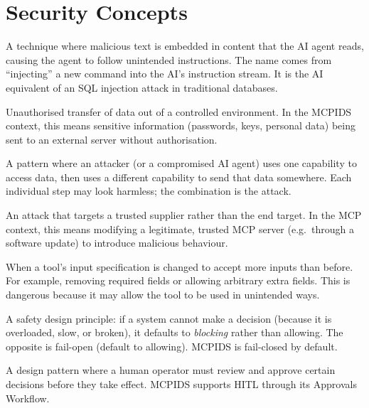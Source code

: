 \documentclass[12pt,a4paper]{report}
\begin{document}
\section{Security Concepts}

\begin{description}[leftmargin=0pt]

  \item[\textbf{Prompt Injection.}] A technique where malicious text is
    embedded in content that the AI agent reads, causing the agent to follow
    unintended instructions. The name comes from ``injecting'' a new command
    into the AI's instruction stream. It is the AI equivalent of an SQL
    injection attack in traditional databases.

  \item[\textbf{Exfiltration.}] Unauthorised transfer of data out of a
    controlled environment. In the MCPIDS context, this means sensitive
    information (passwords, keys, personal data) being sent to an external
    server without authorisation.

  \item[\textbf{Lateral Movement.}] A pattern where an attacker (or a
    compromised AI agent) uses one capability to access data, then uses a
    different capability to send that data somewhere. Each individual step
    may look harmless; the combination is the attack.

  \item[\textbf{Supply Chain Attack.}] An attack that targets a trusted
    supplier rather than the end target. In the MCP context, this means
    modifying a legitimate, trusted MCP server (e.g.\ through a software
    update) to introduce malicious behaviour.

  \item[\textbf{Schema Widening.}] When a tool's input specification is
    changed to accept more inputs than before. For example, removing
    required fields or allowing arbitrary extra fields. This is dangerous
    because it may allow the tool to be used in unintended ways.

  \item[\textbf{Fail-Closed.}] A safety design principle: if a system
    cannot make a decision (because it is overloaded, slow, or broken),
    it defaults to \textit{blocking} rather than allowing. The opposite is
    fail-open (default to allowing). MCPIDS is fail-closed by default.

  \item[\textbf{Human-in-the-Loop (HITL).}] A design pattern where a human
    operator must review and approve certain decisions before they take effect.
    MCPIDS supports HITL through its Approvals Workflow.

\end{description}
\end{document}
